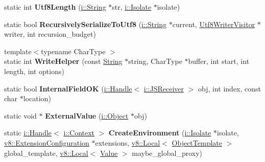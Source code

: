 \begin{DoxyCompactItemize}
\item 
static int {\bfseries Utf8\+Length} (\hyperlink{classv8_1_1internal_1_1_string}{i\+::\+String} $\ast$str, \hyperlink{classv8_1_1internal_1_1_isolate}{i\+::\+Isolate} $\ast$isolate)\hypertarget{namespacev8_a0e2323d398380b2e8c98d719fbc2755b}{}\label{namespacev8_a0e2323d398380b2e8c98d719fbc2755b}

\item 
static bool {\bfseries Recursively\+Serialize\+To\+Utf8} (\hyperlink{classv8_1_1internal_1_1_string}{i\+::\+String} $\ast$current, \hyperlink{classv8_1_1_utf8_writer_visitor}{Utf8\+Writer\+Visitor} $\ast$writer, int recursion\+\_\+budget)\hypertarget{namespacev8_a288d9890ccaf64bcb9e6dae41115aedc}{}\label{namespacev8_a288d9890ccaf64bcb9e6dae41115aedc}

\item 
{\footnotesize template$<$typename Char\+Type $>$ }\\static int {\bfseries Write\+Helper} (const \hyperlink{classv8_1_1_string}{String} $\ast$string, Char\+Type $\ast$buffer, int start, int length, int options)\hypertarget{namespacev8_a8da8e34ddaadb1e8c151f74ae9e72ff4}{}\label{namespacev8_a8da8e34ddaadb1e8c151f74ae9e72ff4}

\item 
static bool {\bfseries Internal\+Field\+OK} (\hyperlink{classv8_1_1internal_1_1_handle}{i\+::\+Handle}$<$ \hyperlink{classv8_1_1internal_1_1_j_s_receiver}{i\+::\+J\+S\+Receiver} $>$ obj, int index, const char $\ast$location)\hypertarget{namespacev8_ab779e0a325c21d462a542da700dfbcb2}{}\label{namespacev8_ab779e0a325c21d462a542da700dfbcb2}

\item 
static void $\ast$ {\bfseries External\+Value} (\hyperlink{classv8_1_1internal_1_1_object}{i\+::\+Object} $\ast$obj)\hypertarget{namespacev8_a83c48506264d4b2e64c54761f0303856}{}\label{namespacev8_a83c48506264d4b2e64c54761f0303856}

\item 
static \hyperlink{classv8_1_1internal_1_1_handle}{i\+::\+Handle}$<$ \hyperlink{classv8_1_1internal_1_1_context}{i\+::\+Context} $>$ {\bfseries Create\+Environment} (\hyperlink{classv8_1_1internal_1_1_isolate}{i\+::\+Isolate} $\ast$isolate, \hyperlink{classv8_1_1_extension_configuration}{v8\+::\+Extension\+Configuration} $\ast$extensions, \hyperlink{classv8_1_1_local}{v8\+::\+Local}$<$ \hyperlink{classv8_1_1_object_template}{Object\+Template} $>$ global\+\_\+template, \hyperlink{classv8_1_1_local}{v8\+::\+Local}$<$ \hyperlink{classv8_1_1_value}{Value} $>$ maybe\+\_\+global\+\_\+proxy)\hypertarget{namespacev8_aa1cb1aeb25d58057aa1be80b8f97651d}{}\label{namespacev8_aa1cb1aeb25d58057aa1be80b8f97651d}


\end{DoxyCompactItemize}

